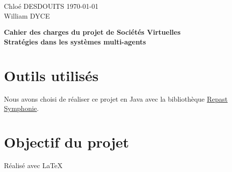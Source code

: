 \documentclass[a4paper]{article}
\begin{document}
\large
\setlength{\parskip}{5mm plus2mm minus2mm}

\begin{titlepage} 
{\setlength{\parindent}{0cm}
Chloé DESDOUITS \hfill \today\\
William DYCE
}
\vfill
{\centering \Large \bfseries Cahier des charges du projet de Sociétés Virtuelles\\Stratégies dans les systèmes multi-agents\par}
\vfill
\tableofcontents
\end{titlepage} 


\section{Outils utilisés}
Nous avons choisi de réaliser ce projet en Java avec la bibliothèque \href{http://repast.sourceforge.net/repast_simphony.html}{Repast Symphonie}.

\section{Objectif du projet}

\vfill
{\raggedleft Réalisé avec \LaTeX{} \par}
\end{document}
